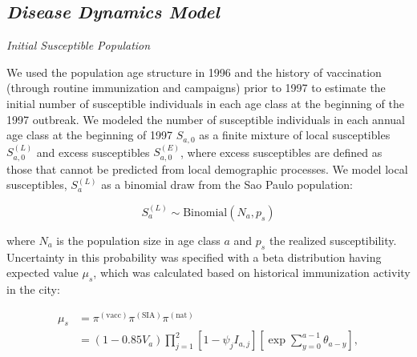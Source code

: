 \subsection{\texorpdfstring{\emph{Disease Dynamics
Model}}{Disease Dynamics Model}}\label{disease-dynamics-model}

\emph{Initial Susceptible Population}

We used the population age structure in 1996 and the history of vaccination (through routine immunization and campaigns) prior to 1997 to estimate the initial number of susceptible individuals in each age class at the beginning of the 1997 outbreak.  We modeled the number of susceptible individuals in each annual age class at the beginning of 1997 \(S_{a,0}\) as a finite mixture of local susceptibles \(S_{a,0}^{(L)}\) and excess susceptibles \(S_{a,0}^{(E)}\), where excess susceptibles are defined as those that cannot be predicted from local demographic processes.  We model local susceptibles, \(S_a^{(L)}\) as a binomial draw from the Sao Paulo population:

\begin{equation}
S_a^{(L)} \sim \text{Binomial}(N_a, p_s)
\end{equation}

where \(N_a\) is the population size in age class \(a\) and \(p_s\) the realized susceptibility. Uncertainty in this probability was specified with a beta distribution having expected value \(\mu_s\), which was calculated based on historical immunization activity in the city:

\begin{equation}
\begin{split}
\mu_s &= \pi^{(\text{vacc})} \pi^{(\text{SIA})}\pi^{(\text{nat})} \\
&= (1- 0.85 V_a) \prod_{j=1}^2 \left[1- \psi_j I_{a,j} \right] \left[\exp \sum_{y=0}^{a-1} \theta_{a-y} \right],
\end{split}
\end{equation}

